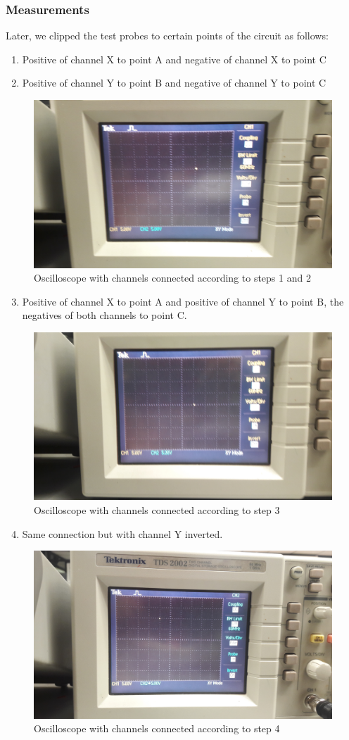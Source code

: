 \documentclass[letterpaper]{article}
\begin{document}
\subsubsection{Measurements}
Later, we clipped the test probes to certain points of the circuit as follows:
\begin{enumerate}
    \item Positive of channel X to point A and negative of channel X to point C
    \item Positive of channel Y to point B and negative of channel Y to point C
\end{enumerate}
\begin{figure}[H]
    \centering
    \includegraphics[width=.5\linewidth]{img/part3/2}
    \caption{Oscilloscope with channels connected according to steps 1 and 2}
\end{figure}
\begin{enumerate}
    \setcounter{enumi}{2}
\item Positive of channel X to point A and positive of channel Y to point B, the negatives of both
channels to point C.
\end{enumerate}
\begin{figure}[H]
    \centering
    \includegraphics[width=.5\linewidth,angle=180]{img/part3/3}
    \caption{Oscilloscope with channels connected according to step 3}
\end{figure}
\begin{enumerate}
    \setcounter{enumi}{3}
\item Same connection but with channel Y inverted.
\end{enumerate}
\begin{figure}[H]
    \centering
    \includegraphics[width=.5\linewidth]{img/part3/5}
    \caption{Oscilloscope with channels connected according to step 4}
\end{figure}
\end{document}
